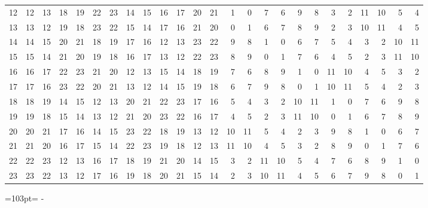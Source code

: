 \documentclass[10pt,a4paper]{article}
\newcommand{\needspace}[1]{\par\penalty-100\begingroup\dimen0=#1\relax\dimen2=\pagegoal
  \advance\dimen2-\pagetotal\ifdim\dimen0>\dimen2\relax\ifdim\dimen2>0pt\vfil\break\fi\fi
  \endgroup}
\numberwithin{equation}{section}
\begin{document}
{\begin{longtable}{@{}r|rrrrrrrrrrrrrrrrrrrrrrrr@{}}
12 & 12 & 13 & 18 & 19 & 22 & 23 & 14 & 15 & 16 & 17 & 20 & 21 & 1 & 0 & 7 & 6 & 9 & 8 & 3 & 2 & 11 & 10 & 5 & 4\\
13 & 13 & 12 & 19 & 18 & 23 & 22 & 15 & 14 & 17 & 16 & 21 & 20 & 0 & 1 & 6 & 7 & 8 & 9 & 2 & 3 & 10 & 11 & 4 & 5\\
14 & 14 & 15 & 20 & 21 & 18 & 19 & 17 & 16 & 12 & 13 & 23 & 22 & 9 & 8 & 1 & 0 & 6 & 7 & 5 & 4 & 3 & 2 & 10 & 11\\
15 & 15 & 14 & 21 & 20 & 19 & 18 & 16 & 17 & 13 & 12 & 22 & 23 & 8 & 9 & 0 & 1 & 7 & 6 & 4 & 5 & 2 & 3 & 11 & 10\\
16 & 16 & 17 & 22 & 23 & 21 & 20 & 12 & 13 & 15 & 14 & 18 & 19 & 7 & 6 & 8 & 9 & 1 & 0 & 11 & 10 & 4 & 5 & 3 & 2\\
17 & 17 & 16 & 23 & 22 & 20 & 21 & 13 & 12 & 14 & 15 & 19 & 18 & 6 & 7 & 9 & 8 & 0 & 1 & 10 & 11 & 5 & 4 & 2 & 3\\
18 & 18 & 19 & 14 & 15 & 12 & 13 & 20 & 21 & 22 & 23 & 17 & 16 & 5 & 4 & 3 & 2 & 10 & 11 & 1 & 0 & 7 & 6 & 9 & 8\\
19 & 19 & 18 & 15 & 14 & 13 & 12 & 21 & 20 & 23 & 22 & 16 & 17 & 4 & 5 & 2 & 3 & 11 & 10 & 0 & 1 & 6 & 7 & 8 & 9\\
20 & 20 & 21 & 17 & 16 & 14 & 15 & 23 & 22 & 18 & 19 & 13 & 12 & 10 & 11 & 5 & 4 & 2 & 3 & 9 & 8 & 1 & 0 & 6 & 7\\
21 & 21 & 20 & 16 & 17 & 15 & 14 & 22 & 23 & 19 & 18 & 12 & 13 & 11 & 10 & 4 & 5 & 3 & 2 & 8 & 9 & 0 & 1 & 7 & 6\\
22 & 22 & 23 & 12 & 13 & 16 & 17 & 18 & 19 & 21 & 20 & 14 & 15 & 3 & 2 & 11 & 10 & 5 & 4 & 7 & 6 & 8 & 9 & 1 & 0\\*
23 & 23 & 22 & 13 & 12 & 17 & 16 & 19 & 18 & 20 & 21 & 15 & 14 & 2 & 3 & 10 & 11 & 4 & 5 & 6 & 7 & 9 & 8 & 0 & 1\\
\bottomrule\end{longtable}}
\needspace{103pt}
\end{document}
